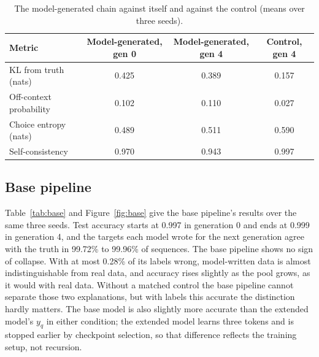 \documentclass[11pt,a4paper]{article}
\newcommand{\yq}{y_{q}}
\begin{document}
\begin{table}[htbp]
\centering
\small
\caption{The model-generated chain against itself and against the control
(means over three seeds).}
\label{tab:chain}
\begin{tabular}{lccc}
\toprule
Metric & Model-generated, gen 0 & Model-generated, gen 4 & Control, gen 4\\
\midrule
KL from truth (nats) & 0.425 & 0.389 & 0.157 \\
Off-context probability & 0.102 & 0.110 & 0.027 \\
Choice entropy (nats) & 0.489 & 0.511 & 0.590 \\
Self-consistency & 0.970 & 0.943 & 0.997 \\
\bottomrule
\end{tabular}
\end{table}

\subsection{Base pipeline}
Table~\ref{tab:base} and Figure~\ref{fig:base} give the base pipeline's
results over the same three seeds. Test accuracy starts at 0.997 in generation 0 and ends at 0.999 in generation 4, and the targets each model wrote for the next generation agree with the truth in 99.72\% to 99.96\% of sequences. The base pipeline shows no sign of collapse. With at most 0.28\% of its labels wrong, model-written data is almost indistinguishable from real data, and accuracy rises slightly as the pool grows, as it would with real data. Without a matched control the base pipeline cannot separate those two explanations, but with labels this accurate the distinction hardly matters. The base model is also slightly more accurate than the extended model's $\yq$ in either condition; the extended model learns three tokens and is stopped earlier by checkpoint selection, so that difference reflects the training setup, not recursion.
\end{document}
